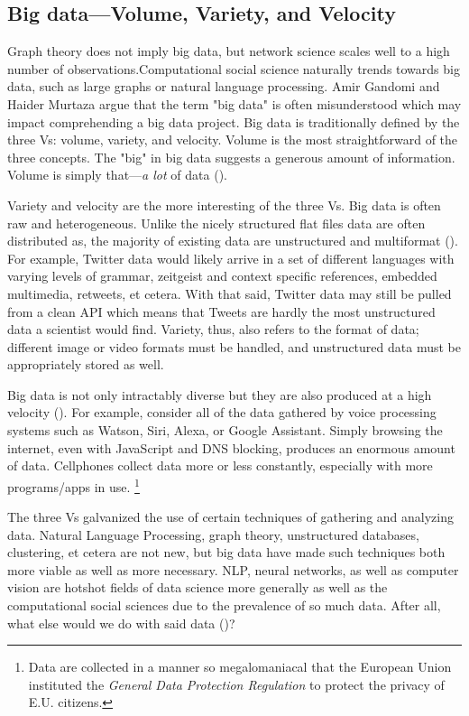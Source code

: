 \documentclass[12pt, a4paper]{article}
\begin{document}
\subsection{Big data---Volume, Variety, and Velocity}
Graph theory does not imply big data, but network science scales well to a high number of observations.Computational social science naturally trends towards big data, such as large graphs or natural language processing. Amir Gandomi and Haider Murtaza argue that the term "big data" is often misunderstood which may impact comprehending a big data project. Big data is traditionally defined by the three Vs: volume, variety, and velocity. Volume is the most straightforward of the three concepts. The "big" in big data suggests a generous amount of information. Volume is simply that---\textit{a lot} of data (\cite{gandomiamir2015}).

Variety and velocity are the more interesting of the three Vs. Big data is often raw and heterogeneous. Unlike the nicely structured flat files data are often distributed as, the majority of existing data are unstructured and multiformat (\cite{gandomiamir2015}). For example, Twitter data would likely arrive in a set of different languages with varying levels of grammar, zeitgeist and context specific references, embedded multimedia, retweets, et cetera. With that said, Twitter data may still be pulled from a clean API which means that Tweets are hardly the most unstructured data a scientist would find. Variety, thus, also refers to the format of data; different image or video formats must be handled, and unstructured data must be appropriately stored as well. 

Big data is not only intractably diverse but they are also produced at a high velocity (\cite{gandomiamir2015}). For example, consider all of the data gathered by voice processing systems such as Watson, Siri, Alexa, or Google Assistant. Simply browsing the internet, even with JavaScript and DNS blocking, produces an enormous amount of data. Cellphones collect data more or less constantly, especially with more programs/apps in use. \footnote{Data are collected in a manner so megalomaniacal that the European Union instituted the \textit{General Data Protection Regulation} to protect the privacy of E.U. citizens.}

The three Vs galvanized the use of certain techniques of gathering and analyzing data. Natural Language Processing, graph theory, unstructured databases, clustering, et cetera are not new, but big data have made such techniques both more viable as well as more necessary. NLP, neural networks, as well as computer vision are hotshot fields of data science more generally as well as the computational social sciences due to the prevalence of so much data. After all, what else would we do with said data (\cite{gandomiamir2015})? 
\end{document}
